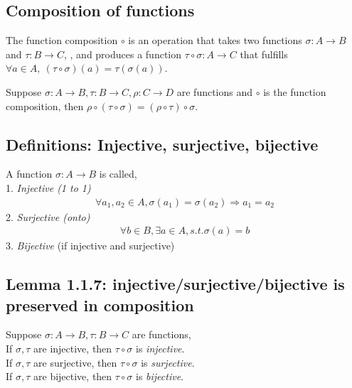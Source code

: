 \documentclass[11pt]{elegantbook}
\begin{document}
\subsection{Composition of functions}
\begin{definition}
\normalfont
The function composition $\circ$ is an operation that takes two functions $\sigma: A\rightarrow B$ and $\tau: B\rightarrow C$, , and produces a function $\tau\circ \sigma:A\rightarrow C$ that fulfills $\forall a\in A,\ (\tau\circ \sigma)(a)=\tau( \sigma(a))$.
\end{definition}

\begin{proposition}
    Suppose $\sigma:A \rightarrow B, \tau:B \rightarrow C, \rho:C \rightarrow D$ are functions and $\circ$ is the function composition, then $\rho\circ(\tau\circ\sigma)=(\rho\circ\tau)\circ\sigma$.
\end{proposition}
\subsection{Definitions: Injective, surjective, bijective}
A function $\sigma:A \rightarrow B$ is called,\\
1. \textit{Injective (1 to 1)}
\begin{equation}
    \begin{aligned}
        \forall a_1,a_2\in A, \sigma(a_1)=\sigma(a_2)\Rightarrow a_1=a_2
    \end{aligned}
    \nonumber
\end{equation}
2. \textit{Surjective (onto)}
\begin{equation}
    \begin{aligned}
        \forall b\in B,\exists a\in A, s.t. \sigma(a)=b
    \end{aligned}
    \nonumber
\end{equation}
3. \textit{Bijective} (if injective and surjective)

\subsection{Lemma 1.1.7: injective/surjective/bijective is preserved in composition}
\begin{lemma}[Lemma 1.1.7]
    Suppose $\sigma:A \rightarrow B, \tau: B \rightarrow C$ are functions,\\
    If $\sigma, \tau$ are injective, then $\tau\circ\sigma$ is \textit{injective}.\\
    If $\sigma, \tau$ are surjective, then $\tau\circ\sigma$ is \textit{surjective}.\\
    If $\sigma, \tau$ are bijective, then $\tau\circ\sigma$ is \textit{bijective}.
\end{lemma}
\end{document}
